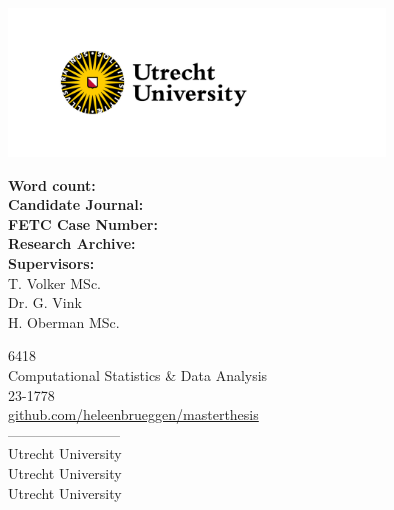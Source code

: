 \documentclass[10pt, a4paper, titlepage]{article}
\begin{document}
\begin{titlingpage}
\begin{center}
\vspace{4cm}

\begin{minipage}{.5\textwidth}
\begin{center}
            \includegraphics[width=10cm]{graphs/UU_logo_2021_EN_RGB.png}
\end{center}
\end{minipage}%
    
\vspace{.25cm}

\begin{minipage}{0.5\textwidth}
\begin{flushleft}

\textbf{Word count:} \\
\textbf{Candidate Journal:} \\
\textbf{FETC Case Number:} \\
\textbf{Research Archive:} \\
\textbf{Supervisors:} \\
T. Volker MSc. \\
Dr. G. Vink \\
H. Oberman MSc.
\end{flushleft}
\end{minipage}%
\begin{minipage}{0.5\textwidth}
\begin{flushright}

6418 \\ 
Computational Statistics \& Data Analysis \\
23-1778 \\
\url{github.com/heleenbrueggen/masterthesis} \\
------------------------\\
Utrecht University \\
Utrecht University \\
Utrecht University
\end{flushright}
\end{minipage}

\end{center}
\end{titlingpage}
\end{document}
